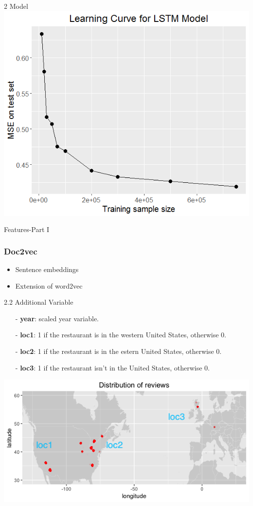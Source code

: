 \documentclass[10pt]{beamer}
\begin{document}
\begin{frame}{2 Model}
	\centering
	\includegraphics[scale=0.4]{../image/learning_curve.png}
\end{frame}

\begin{frame}{Features-Part I}
\frametitle{Doc2vec}
\begin{itemize}
	\item Sentence embeddings
	\item Extension of word2vec
\end{itemize}
\end{frame}


\begin{frame}{2.2 Additional Variable}

\begin{itemize}
	\item[-] \textbf{year}: scaled year variable.
	
	\item[-] \textbf{loc1}: 1 if the restaurant is in the western United States, otherwise 0.
	
	\item[-] \textbf{loc2}: 1 if the restaurant is in the estern United States, otherwise 0.
	
	\item[-] \textbf{loc3}: 1 if the restaurant isn't in the United States, otherwise 0.
	
\end{itemize}
\centering
\includegraphics[scale=0.4]{../image/worldmap.png}
\end{frame}
\end{document}
